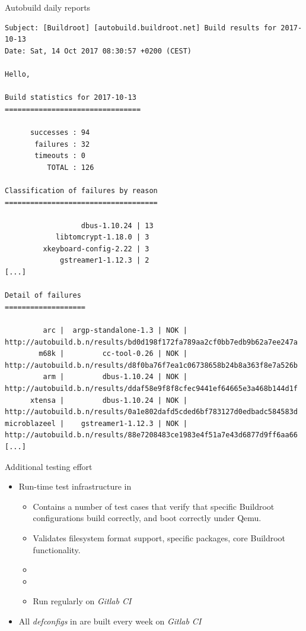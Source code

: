 \begin{frame}[fragile]{Autobuild daily reports}

{\tiny
\begin{verbatim}
Subject: [Buildroot] [autobuild.buildroot.net] Build results for 2017-10-13
Date: Sat, 14 Oct 2017 08:30:57 +0200 (CEST)

Hello,

Build statistics for 2017-10-13
================================

      successes : 94 
       failures : 32 
       timeouts : 0  
          TOTAL : 126

Classification of failures by reason
====================================

                  dbus-1.10.24 | 13
            libtomcrypt-1.18.0 | 3 
         xkeyboard-config-2.22 | 3 
             gstreamer1-1.12.3 | 2 
[...]

Detail of failures
===================

         arc |  argp-standalone-1.3 | NOK | http://autobuild.b.n/results/bd0d198f172fa789aa2cf0bb7edb9b62a7ee247a
        m68k |         cc-tool-0.26 | NOK | http://autobuild.b.n/results/d8f0ba76f7ea1c06738658b24b8a363f8e7a526b
         arm |         dbus-1.10.24 | NOK | http://autobuild.b.n/results/ddaf58e9f8f8cfec9441ef64665e3a468b144d1f
      xtensa |         dbus-1.10.24 | NOK | http://autobuild.b.n/results/0a1e802dafd5cded6bf783127d0edbadc584583d
microblazeel |    gstreamer1-1.12.3 | NOK | http://autobuild.b.n/results/88e7208483ce1983e4f51a7e43d6877d9ff6aa66
[...]
\end{verbatim}}

\end{frame}

\begin{frame}{Additional testing effort}
  \begin{itemize}
  \item Run-time test infrastructure in 
    \begin{itemize}
    \item Contains a number of test cases that verify that specific
      Buildroot configurations build correctly, and boot correctly
      under Qemu.
    \item Validates filesystem format support, specific packages, core
      Buildroot functionality.
    \item {}
    \item {}
    \item Run regularly on {\em Gitlab CI}
    \end{itemize}
  \item All {\em defconfigs} in  are built every week
    on {\em Gitlab CI}
  \end{itemize}
\end{frame}
